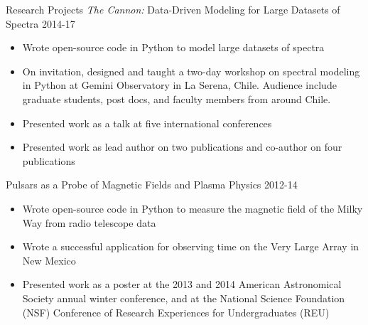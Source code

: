 \documentclass{resume} %
\begin{document}
\begin{rSection}{Research Projects}
\emph{The Cannon:} Data-Driven Modeling for Large Datasets of Spectra
\hfill 2014-17
\begin{itemize}
  \item
    Wrote open-source code in Python to model large datasets of spectra
  \item
    On invitation, designed and taught a two-day workshop on spectral modeling
    in Python at Gemini Observatory in La Serena, Chile. 
    Audience include graduate students, post docs, and faculty members from
    around Chile.
  \item
    Presented work as a talk at five international conferences
  \item
    Presented work as lead author on two publications and 
    co-author on four publications
\end{itemize}

Pulsars as a Probe of Magnetic Fields and Plasma Physics
\hfill 2012-14
\begin{itemize}
  \item Wrote open-source code in Python to measure the 
    magnetic field of the Milky Way from radio telescope data
  \item Wrote a successful application for observing time on the 
    Very Large Array in New Mexico
  \item Presented work as a poster at the 2013 and 2014 
    American Astronomical Society annual winter conference, 
    and at the National Science Foundation (NSF) Conference of 
    Research Experiences for Undergraduates (REU)
\end{itemize}

\end{rSection}

\end{document}
